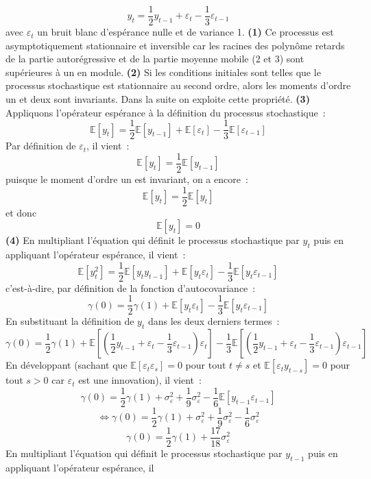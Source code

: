 \documentclass[10pt,a4paper,notitlepage,onecolumn]{article}
\newcommand{\question}[1]{\textbf{(#1)}}
\begin{document}
\[
y_t = \frac{1}{2}y_{t-1} + \varepsilon_t - \frac{1}{3} \varepsilon_{t-1}
\]
avec $\varepsilon_t$ un  bruit blanc d'espérance nulle  et de variance
1.   \question{1} Ce  processus est  asymptotiquement stationnaire  et
inversible  car  les  racines  des   polynôme  retards  de  la  partie
autorégressive  et  de  la  partie   moyenne  mobile  (2  et  3)  sont
supérieures à un  en module. \question{2} Si  les conditions initiales
sont telles que  le processus stochastique est  stationnaire au second
ordre, alors les  moments d'ordre un et deux sont  invariants. Dans la
suite on exploite cette propriété. \question{3} Appliquons l'opérateur
espérance à la définition du processus stochastique :
\[
\mathbb E [y_t] = \frac{1}{2}\mathbb E [y_{t-1}] + \mathbb E [\varepsilon_t] - \frac{1}{3} \mathbb E [\varepsilon_{t-1}]
\]
Par définition de $\varepsilon_t$, il vient :
\[
\mathbb E [y_t] = \frac{1}{2}\mathbb E [y_{t-1}]
\]
puisque le moment d'ordre un est invariant, on a encore :
\[
\mathbb E [y_t] = \frac{1}{2}\mathbb E [y_{t}]
\]
et donc
\[
\mathbb E [y_t] = 0
\]
\question{4}  En  multipliant  l'équation  qui  définit  le  processus
stochastique par  $y_t$ puis  en appliquant l'opérateur  espérance, il
vient :
\[
\mathbb E [y_t^2] = \frac{1}{2}\mathbb E [y_ty_{t-1}] + \mathbb E [y_t\varepsilon_t] - \frac{1}{3} \mathbb E [y_t\varepsilon_{t-1}]
\]
c'est-à-dire, par définition de la fonction d'autocovariance :
\[
\gamma(0) = \frac{1}{2}\gamma(1) + \mathbb E [y_t\varepsilon_t] - \frac{1}{3} \mathbb E [y_t\varepsilon_{t-1}]
\]
En substituant la définition de $y_t$ dans les deux derniers termes :
\[
\gamma(0) = \frac{1}{2}\gamma(1) + \mathbb E \left[\left(\frac{1}{2}y_{t-1} + \varepsilon_t - \frac{1}{3} \varepsilon_{t-1}\right)\varepsilon_t\right]
- \frac{1}{3} \mathbb E \left[\left(\frac{1}{2}y_{t-1} + \varepsilon_t - \frac{1}{3} \varepsilon_{t-1}\right)\varepsilon_{t-1}\right]
\]
En développant (sachant que $\mathbb E[\varepsilon_t\varepsilon_s] = 0$ pour tout $t\neq s$ et $\mathbb E[\varepsilon_ty_{t-s}] = 0$ pour tout $s>0$ car $\varepsilon_t$ est une innovation), il vient :
\[
\gamma(0) = \frac{1}{2}\gamma(1) + \sigma_{\varepsilon}^2
+ \frac{1}{9}\sigma_{\varepsilon}^2 - \frac{1}{6} \mathbb E \left[y_{t-1}\varepsilon_{t-1}\right]
\]
\[
\Leftrightarrow \gamma(0) = \frac{1}{2}\gamma(1) + \sigma_{\varepsilon}^2
+ \frac{1}{9}\sigma_{\varepsilon}^2 - \frac{1}{6}\sigma_{\varepsilon}^2
\]
\[
\gamma(0) = \frac{1}{2}\gamma(1) + \frac{17}{18}\sigma_{\varepsilon}^2
\]
En  multipliant  l'équation  qui  définit  le  processus
stochastique par  $y_{t-1}$ puis  en appliquant l'opérateur  espérance, il
\end{document}
